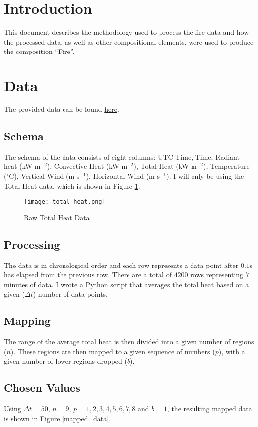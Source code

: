 \documentclass[12pt]{article}
\begin{document}
\thispagestyle{fancy}
\newcommand{\HRule}{\rule{\linewidth}{0.5mm}}

\setlength{\parindent}{0pt}
\tableofcontents
\newpage

\section{Introduction}
This document describes the methodology used to process the fire data and how the processed data, as well as other compositional elements, were used to produce the composition ``Fire''.
\section{Data}
The provided data can be found \href{https://drive.google.com/drive/folders/1sgDxNkrS1AG77fC-4ga5EZ2CEBacdBM3}{here}.
\subsection{Schema}
The schema of the data consists of eight columns: UTC Time, Time, Radiant heat (kW m$^{-2}$), Convective Heat (kW m$^{-2}$), Total Heat (kW m$^{-2}$), Temperature ($^{\circ}$C), Vertical Wind (m s$^{-1}$), Horizontal Wind (m s${^{-1}}$). I will only be using the Total Heat data, which is shown in Figure \ref{total_heat}.

\begin{figure}[h!]
\centerline{\texttt{[image: total\_heat.png]}}
\caption{Raw Total Heat Data}
\label{total_heat}
\end{figure}

\subsection{Processing}
The data is in chronological order and each row represents a data point after $0.1$s has elapsed from the previous row. There are a total of $4200$ rows representing $7$ minutes of data. I wrote a Python script that averages the total heat based on a given ($\Delta t$) number of data points. 
\subsection{Mapping}
The range of the average total heat is then divided into a given number of regions ($n$). These regions are then mapped to a given sequence of numbers ($p$), with a given number of lower regions dropped ($b$).
\subsection{Chosen Values}
Using $\Delta t = 50$, $n = 9$, $p = 1, 2, 3, 4, 5, 6, 7, 8$ and $b = 1$, the resulting mapped data is shown in Figure \ref{mapped_data}.
\end{document}
